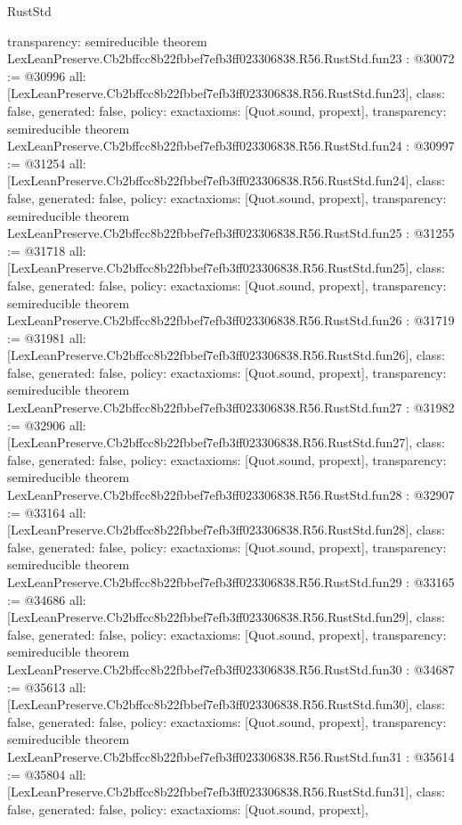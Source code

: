 \begin{lexlean}{RustStd}
\begin{coremodule}
{  transparency: semireducible
}
theorem LexLeanPreserve.Cb2bffcc8b22fbbef7efb3ff023306838.R56.RustStd.fun23 : @30072 := @30996 {
  all: [LexLeanPreserve.Cb2bffcc8b22fbbef7efb3ff023306838.R56.RustStd.fun23],
  class: false,
  generated: false,
  policy: exact{axioms: [Quot.sound, propext]},
  transparency: semireducible
}
theorem LexLeanPreserve.Cb2bffcc8b22fbbef7efb3ff023306838.R56.RustStd.fun24 : @30997 := @31254 {
  all: [LexLeanPreserve.Cb2bffcc8b22fbbef7efb3ff023306838.R56.RustStd.fun24],
  class: false,
  generated: false,
  policy: exact{axioms: [Quot.sound, propext]},
  transparency: semireducible
}
theorem LexLeanPreserve.Cb2bffcc8b22fbbef7efb3ff023306838.R56.RustStd.fun25 : @31255 := @31718 {
  all: [LexLeanPreserve.Cb2bffcc8b22fbbef7efb3ff023306838.R56.RustStd.fun25],
  class: false,
  generated: false,
  policy: exact{axioms: [Quot.sound, propext]},
  transparency: semireducible
}
theorem LexLeanPreserve.Cb2bffcc8b22fbbef7efb3ff023306838.R56.RustStd.fun26 : @31719 := @31981 {
  all: [LexLeanPreserve.Cb2bffcc8b22fbbef7efb3ff023306838.R56.RustStd.fun26],
  class: false,
  generated: false,
  policy: exact{axioms: [Quot.sound, propext]},
  transparency: semireducible
}
theorem LexLeanPreserve.Cb2bffcc8b22fbbef7efb3ff023306838.R56.RustStd.fun27 : @31982 := @32906 {
  all: [LexLeanPreserve.Cb2bffcc8b22fbbef7efb3ff023306838.R56.RustStd.fun27],
  class: false,
  generated: false,
  policy: exact{axioms: [Quot.sound, propext]},
  transparency: semireducible
}
theorem LexLeanPreserve.Cb2bffcc8b22fbbef7efb3ff023306838.R56.RustStd.fun28 : @32907 := @33164 {
  all: [LexLeanPreserve.Cb2bffcc8b22fbbef7efb3ff023306838.R56.RustStd.fun28],
  class: false,
  generated: false,
  policy: exact{axioms: [Quot.sound, propext]},
  transparency: semireducible
}
theorem LexLeanPreserve.Cb2bffcc8b22fbbef7efb3ff023306838.R56.RustStd.fun29 : @33165 := @34686 {
  all: [LexLeanPreserve.Cb2bffcc8b22fbbef7efb3ff023306838.R56.RustStd.fun29],
  class: false,
  generated: false,
  policy: exact{axioms: [Quot.sound, propext]},
  transparency: semireducible
}
theorem LexLeanPreserve.Cb2bffcc8b22fbbef7efb3ff023306838.R56.RustStd.fun30 : @34687 := @35613 {
  all: [LexLeanPreserve.Cb2bffcc8b22fbbef7efb3ff023306838.R56.RustStd.fun30],
  class: false,
  generated: false,
  policy: exact{axioms: [Quot.sound, propext]},
  transparency: semireducible
}
theorem LexLeanPreserve.Cb2bffcc8b22fbbef7efb3ff023306838.R56.RustStd.fun31 : @35614 := @35804 {
  all: [LexLeanPreserve.Cb2bffcc8b22fbbef7efb3ff023306838.R56.RustStd.fun31],
  class: false,
  generated: false,
  policy: exact{axioms: [Quot.sound, propext]},
}
\end{coremodule}
\end{lexlean}
